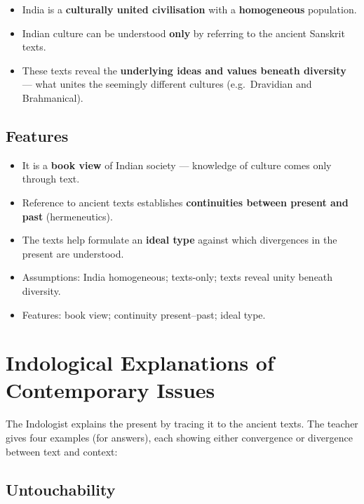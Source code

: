 \begin{itemize}
\item India is a \textbf{culturally united civilisation} with a \textbf{homogeneous} population.
\item Indian culture can be understood \textbf{only} by referring to the ancient Sanskrit texts.
\item These texts reveal the \textbf{underlying ideas and values beneath diversity} --- what unites the seemingly different cultures (e.g.\ Dravidian and Brahmanical).
\end{itemize}

\subsection{Features}

\begin{itemize}
\item It is a \textbf{book view} of Indian society --- knowledge of culture comes only through text.
\item Reference to ancient texts establishes \textbf{continuities between present and past} (hermeneutics).
\item The texts help formulate an \textbf{ideal type} against which divergences in the present are understood.
\end{itemize}

\begin{QuickRevision}
\begin{itemize}
\item Assumptions: India homogeneous; texts-only; texts reveal unity beneath diversity.
\item Features: book view; continuity present--past; ideal type.
\end{itemize}
\end{QuickRevision}

\section{Indological Explanations of Contemporary Issues}

The Indologist explains the present by tracing it to the ancient texts. The teacher gives four examples (for answers), each showing either convergence or divergence between text and context:

\subsection{Untouchability}

